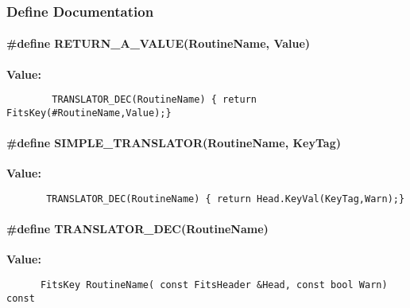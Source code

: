 \subsubsection{Define Documentation}
\paragraph{\setlength{\rightskip}{0pt plus 5cm}\#define RETURN\_\-A\_\-VALUE(Routine\-Name, Value)}\hfill\label{fitstoad_cc_a3}


{\bf Value:}\footnotesize\begin{verbatim}        TRANSLATOR_DEC(RoutineName) { return FitsKey(#RoutineName,Value);}
\end{verbatim}\normalsize 
{}
\paragraph{\setlength{\rightskip}{0pt plus 5cm}\#define SIMPLE\_\-TRANSLATOR(Routine\-Name, Key\-Tag)}\hfill\label{fitstoad_cc_a2}


{\bf Value:}\footnotesize\begin{verbatim}       TRANSLATOR_DEC(RoutineName) { return Head.KeyVal(KeyTag,Warn);}
\end{verbatim}\normalsize 
{}
\paragraph{\setlength{\rightskip}{0pt plus 5cm}\#define TRANSLATOR\_\-DEC(Routine\-Name)}\hfill\label{fitstoad_cc_a1}


{\bf Value:}\footnotesize\begin{verbatim}      FitsKey RoutineName( const FitsHeader &Head, const bool Warn) const
\end{verbatim}\normalsize 
